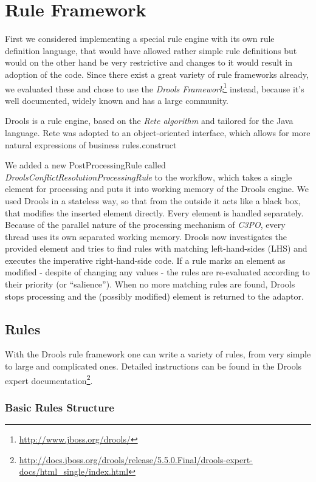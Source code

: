 \documentclass[a4paper,12pt]{article}
\begin{document}
\section{Rule Framework}

First we considered implementing a special rule engine with its own rule definition language, that would have allowed rather simple rule definitions but would on the other hand be very restrictive and changes to it would result in adoption of the code. Since there exist a great variety of rule frameworks already, we evaluated these and chose to use the \emph{Drools Framework}\footnote{\url{http://www.jboss.org/drools/}} instead, because it's well documented, widely known and has a large community.

Drools is a rule engine, based on the \emph{Rete algorithm} and tailored for the Java language. Rete was adopted to an object-oriented interface, which allows for more natural expressions of business rules.construct

We added a new PostProcessingRule called \emph{DroolsConflictResolutionProcessingRule} to the workflow, which takes a single element for processing and puts it into working memory of the Drools engine. We used Drools in a stateless way, so that from the outside it acts like a black box, that modifies the inserted element directly. Every element is handled separately. Because of the parallel nature of the processing mechanism of \emph{C3PO}, every thread uses its own separated working memory. Drools now investigates the provided element and tries to find rules with matching left-hand-sides (LHS) and executes the imperative right-hand-side code. If a rule marks an element as modified - despite of changing any values - the rules are re-evaluated according to their priority (or ``salience''). When no more matching rules are found, Drools stops processing and the (possibly modified) element is returned to the adaptor.

\subsection{Rules}

With the Drools rule framework one can write a variety of rules, from very simple to large and complicated ones. Detailed instructions can be found in the Drools expert documentation\footnote{\url{http://docs.jboss.org/drools/release/5.5.0.Final/drools-expert-docs/html_single/index.html}}.

\subsubsection{Basic Rules Structure}
\end{document}
